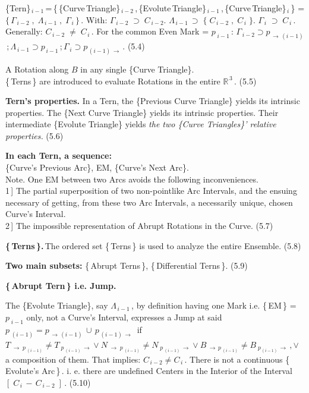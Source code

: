 \documentclass[12pt]{article} %
\begin{document}
\noindent \{Tern\}$_{\,i-1}$\,=\,\big\{\,\{Curve\,Triangle\}$_{\,i-2}$\,,\,\{Evolute\,Triangle\}$_{\,i-1}$\,,\,\{Curve\,Triangle\}$_{\,i}$\,\big\} = $\{\,\Gamma_{\,i-2}\;,\;\Lambda_{\,i-1}\;,\;\Gamma_{\,i}\,\}$\,. \; With:\; $\Gamma_{\,i-2}\;\supset\;C_{\,i-2}$\;. $\Lambda_{\,i-1}\,\supset\;\{\;C_{\,i-2}\;,\;C_{\,i}\;\}$\;. $\Gamma_{\,i}\;\supset\;C_{\,i}$\,. Generally:\; $C_{\,i-2}\;\neq\;C_{\,i}$\,. For the common Even Mark = $p_{\;i-1}$\,: $\Gamma_{\,i-2} \supset p_{\,\to\,(i-1)}$\;\,;\,\;$\Lambda_{\,i-1} \supset p_{\,i-1}$\;\,;\,\;$\Gamma_{\,i} \supset p_{\,(i-1)\,\to}$\,. \qquad(5.4)

\noindent A Rotation along $B$ in any single \{Curve Triangle\}.\\\{\,Terns\,\} are introduced to evaluate Rotations in the entire $\mathbb{R}^{\,3}$\,. \qquad (5.5) 

\noindent \textbf{Tern's properties.} In a Tern, the \{Previous Curve Triangle\} yields its intrinsic properties. The \{Next Curve Triangle\} yields its intrinsic properties. Their intermediate \{Evolute Triangle\} yields \textsl{the two \{Curve Triangles\}' relative properties.} \qquad \qquad (5.6)

\noindent \textbf{In each Tern, a sequence:}\\ \{Curve's Previous Arc\}, EM, \{Curve's Next Arc\}.\\ Note. One EM between two Arcs avoids the following inconveniences.\\ 1\,] The partial superposition of two non-pointlike Arc Intervals, and the ensuing necessary of getting, from these two Arc Intervals, a necessarily unique, chosen Curve's Interval.\\ 2\,] The impossible representation of Abrupt Rotations in the Curve. \qquad (5.7)

\noindent \textbf{\{\,Terns\,\}.}\,The ordered set \{\,Terns\,\} is used to analyze the entire Ensemble.  (5.8)

\noindent \textbf{Two main subsets:} \quad \{\,Abrupt Terns\,\}, \{\,Differential Terns\,\}. \qquad (5.9)

\noindent \textbf{\{\,Abrupt Tern\,\} i.e. Jump.}

\noindent The \{Evolute Triangle\}, say $\Lambda_{\,i-1}$\,, by definition having one Mark i.e. \{\,EM\,\} = $p_{\;i-1}$ only, not a Curve's Interval, expresses a Jump at said\\ $p_{\;(i-1)} = p_{\,\to\,(i-1)}\,\cup\,p_{\,(i-1)\,\to}$\, if\\ $T_{\;\to\;p_{\;(i-1)}} \neq T_{\;p_{\;(i-1)}\,\to} \vee N_{\;\to\;p_{\;(i-1)}} \neq N_{\;p_{\;(i-1)}\,\to} \vee B_{\;\to\,p_{\;(i-1)}} \neq B_{\;p_{\,(i-1)}\,\to}\,, \vee$ a composition of them. That implies: $C_{\,i-2} \neq C_{\,i}$\,. There is not a continuous \{\,Evolute's Arc\,\}\,. i. e. there are undefined Centers in the Interior of the Interval $[\;C_{\,i}\,-\,C_{\,i-2}\;]$\,. \qquad \qquad (5.10)
\end{document}

